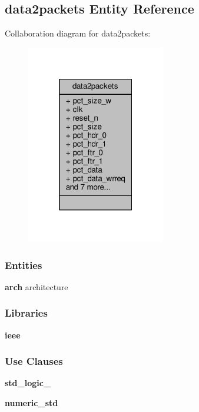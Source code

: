 \subsection{data2packets Entity Reference}
\label{classdata2packets}


Collaboration diagram for data2packets\+:\nopagebreak
\begin{figure}[H]
\begin{center}
\leavevmode
\includegraphics[width=172pt]{d0/d1b/classdata2packets__coll__graph}
\end{center}
\end{figure}
\subsubsection*{Entities}
\begin{DoxyCompactItemize}
\item 
{\bf arch} architecture
\end{DoxyCompactItemize}
\subsubsection*{Libraries}
 \begin{DoxyCompactItemize}
\item 
{\bf ieee} 
\end{DoxyCompactItemize}
\subsubsection*{Use Clauses}
 \begin{DoxyCompactItemize}
\item 
{\bf std\+\_\+logic\+\_}   
\item 
{\bf numeric\+\_\+std}   
\end{DoxyCompactItemize}
